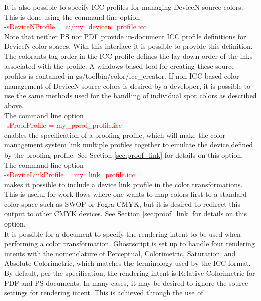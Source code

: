 \documentclass[12pt,notitlepage]{article}
\begin{document}
 It is also possible to specify ICC profiles for managing DeviceN source colors. This is done using the command line option\\

\textcolor{red}{-sDeviceNProfile = c:/my\_devicen\_profile.icc}\\

 \noindent Note that neither PS nor PDF provide in-document ICC profile definitions for DeviceN color spaces. With this interface it is possible to provide this definition. The colorants tag order in the ICC profile defines the lay-down order of the inks associated with the profile. A windows-based tool for creating these source profiles is contained in gs/toolbin/color/icc\_creator.  If non-ICC based color management of DeviceN source colors is desired by a developer, it is possible to use the same methods used for the handling of individual spot colors as described above.\\

The command line option\\

\textcolor{red}{-sProofProfile = my\_proof\_profile.icc}\\

\noindent enables the specification of a proofing profile, which will make the color management system link multiple profiles together to emulate the device defined by the proofing profile.  See Section \ref{sec:proof_link} for details on this option.\\

The command line option\\

\textcolor{red}{-sDeviceLinkProfile = my\_link\_profile.icc}\\

 \noindent makes it possible to include a device link profile in the color transformations.  This is useful for work flows where one wants to map colors first to a standard color space such as SWOP or Fogra CMYK, but it is desired to redirect this output to other CMYK devices. See Section \ref{sec:proof_link} for details on this option.\\

It is possible for a document to specify the rendering intent to be used when performing a color transformation.  Ghostscript is set up to handle four rendering intents with the nomenclature of Perceptual, Colorimetric, Saturation, and Absolute Colorimetric, which matches the terminology used by the ICC format.  By default, per the specification, the rendering intent is Relative Colorimetric for PDF and PS documents.  In many cases, it may be desired to ignore the source settings for rendering intent.  This is achieved through the use of\\
\end{document}
